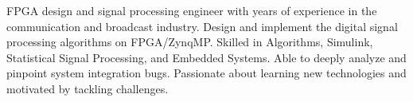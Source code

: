 \setcounter{experience_years}{\year}
\addtocounter{experience_years}{-2013}

\par{
    FPGA design and signal processing engineer with \the\value{experience_years}{\small +} years of experience in the communication
    and broadcast industry. Design and implement the digital signal processing algorithms on FPGA/ZynqMP.
    Skilled in Algorithms, Simulink, Statistical Signal Processing, and Embedded Systems.
    Able to deeply analyze and pinpoint system integration bugs. Passionate about learning
    new technologies and motivated by tackling challenges.
    \\
}
